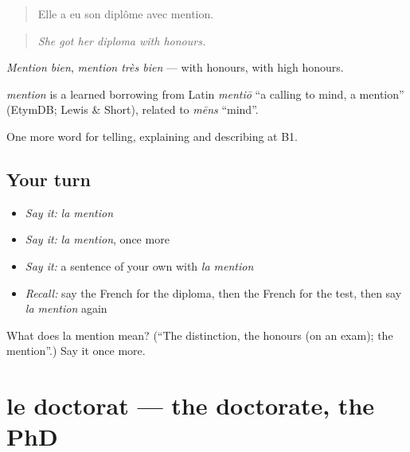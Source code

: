 \begin{quote}
Elle a eu son diplôme avec mention.
\end{quote}

\begin{quote}
\emph{She got her diploma with honours.}
\end{quote}

\emph{Mention bien}, \emph{mention très bien} — with honours, with high honours.

\begin{cousinweb}
\emph{mention} is a learned borrowing from Latin \emph{mentiō} \textquotedblleft{}a calling to mind, a mention\textquotedblright{} (EtymDB; Lewis \& Short), related to \emph{mēns} \textquotedblleft{}mind\textquotedblright{}.
\end{cousinweb}

\begin{grammarlens}[title={What you've built}]
One more word for telling, explaining and describing at B1.
\end{grammarlens}

\subsection*{Your turn}
\begin{itemize}
\raggedright
  \item \emph{Say it:} \emph{la mention}
  \item \emph{Say it:} \emph{la mention}, once more
  \item \emph{Say it:} a sentence of your own with \emph{la mention}
  \item \emph{Recall:} say the French for the diploma, then the French for the test, then say \emph{la mention} again
\end{itemize}

\begin{tcolorbox}[breakable,colback=teal!4,colframe=teal!35!black,title={Before you move on}]
What does la mention mean? (\textquotedblleft{}The distinction, the honours (on an exam); the mention\textquotedblright{}.) Say it once more.
\end{tcolorbox}
\section[le doctorat]{le doctorat — the doctorate, the PhD}

\label{lesson:FR-C379-doctorat}



